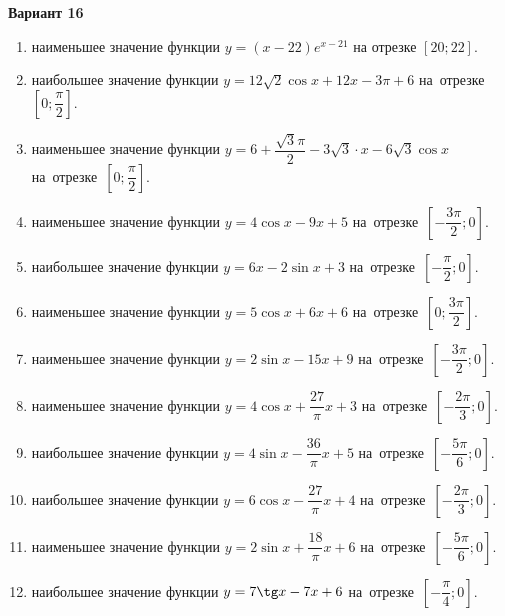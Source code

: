 \documentclass[a4paper,10pt]{article}
\begin{document}
\begin{center}\Large\textbf{Вариант 16}\end{center}

\begin{enumerate}
\item {} наименьшее значение функции $y=\left(x-22\right)e^{x-21}$ на отрезке $\left[20;22\right]$.

\item {} наибольшее значение функции $y=12\sqrt{2}\cos x+12x-3\pi +6$ на~отрезке~$\left[0;\dfrac{\pi }{2}\right]$.

\item {} наименьшее значение функции $y=6+\dfrac{\sqrt{3}\pi }{2}-3\sqrt{3}\cdot x-6\sqrt{3}\cos x$ на~отрезке~$\left[0;\dfrac{\pi }{2}\right]$.

\item {} наименьшее значение функции $y=4\cos x-9x+5$ на~отрезке~$\left[-\dfrac{3\pi }{2};0\right]$.

\item {} наибольшее значение функции $y=6x-2\sin x+3$ на~отрезке~$\left[-\dfrac{\pi }{2};0\right]$.

\item {} наименьшее значение функции $y=5\cos x+6x+6$ на~отрезке~$\left[0;\dfrac{3\pi }{2}\right]$.

\item {} наименьшее значение функции $y=2\sin x-15x+9$ на~отрезке~$\left[-\dfrac{3\pi }{2};0\right]$.

\item {} наименьшее значение функции $y=4\cos x+\dfrac{27}{\pi }x+3$ на~отрезке~$\left[-\dfrac{2\pi }{3};0\right]$.

\item {} наибольшее значение функции $y=4\sin x-\dfrac{36}{\pi }x+5$ на~отрезке~$\left[-\dfrac{5\pi }{6};0\right]$.

\item {} наибольшее значение функции $y=6\cos x-\dfrac{27}{\pi }x+4$ на~отрезке~$\left[-\dfrac{2\pi }{3};0\right]$.

\item {} наименьшее значение функции $y=2\sin x+\dfrac{18}{\pi }x+6$ на~отрезке~$\left[-\dfrac{5\pi }{6};0\right]$.

\item {} наибольшее значение функции $y=7\tg x-7x+6$ на~отрезке~$\left[-\dfrac{\pi }{4};0\right]$.


\end{enumerate}
\end{document}
